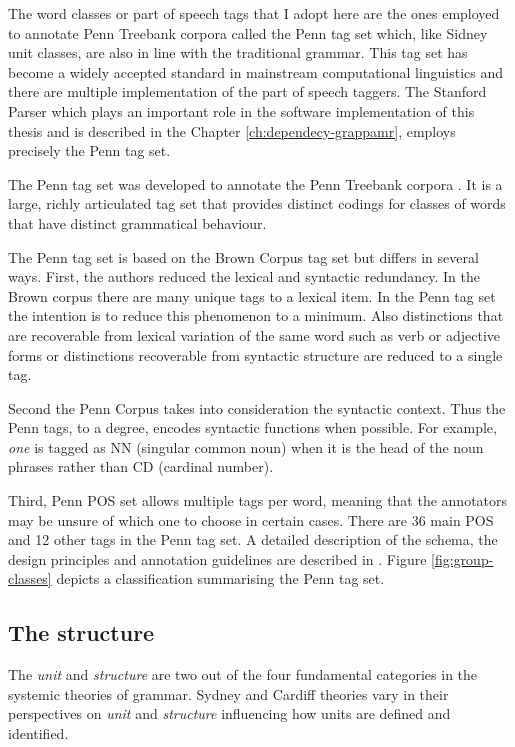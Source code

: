 
The word classes or part of speech tags that I adopt here are the ones employed to annotate Penn Treebank corpora called the Penn tag set \citep{Marcus1993} which, like Sidney unit classes, are also in line with the traditional grammar. This tag set has become a widely accepted standard in mainstream computational linguistics and there are multiple implementation of the part of speech taggers. The Stanford Parser which plays an important role in the software implementation of this thesis and is described in the Chapter \ref{ch:dependecy-grappamr}, employs precisely the Penn tag set.

The Penn tag set was developed to annotate the Penn Treebank corpora \citep{Marcus1993}. It is a large, richly articulated tag set that provides distinct codings for classes of words that have distinct grammatical behaviour.

The Penn tag set is based on the Brown Corpus tag set \citep{Kucera1968} but differs in several ways. First, the authors reduced the lexical and syntactic redundancy. In the Brown corpus there are many unique tags to a lexical item. In the Penn tag set the intention is to reduce this phenomenon to a minimum. Also distinctions that are recoverable from lexical variation of the same word such as verb or adjective forms or distinctions recoverable from syntactic structure are reduced to a single tag. 

Second the Penn Corpus takes into consideration the syntactic context. Thus the Penn tags, to a degree, encodes syntactic functions when possible. For example, \textit{one} is tagged as NN (singular common noun) when it is the head of the noun phrases rather than CD (cardinal number). 

Third, Penn POS set allows multiple tags per word, meaning that the annotators may be unsure of which one to choose in certain cases. There are 36 main POS and 12 other tags in the Penn tag set. A detailed description of the schema, the design principles and annotation guidelines are described in \citep{Santorini1990}. Figure \ref{fig:group-classes} depicts a classification summarising the Penn tag set. 

\subsection{The structure}
The \textit{unit} and \textit{structure} are two out of the four fundamental categories in the systemic theories of grammar. Sydney and Cardiff theories vary in their perspectives on \textit{unit} and \textit{structure} influencing how units are defined and identified.

